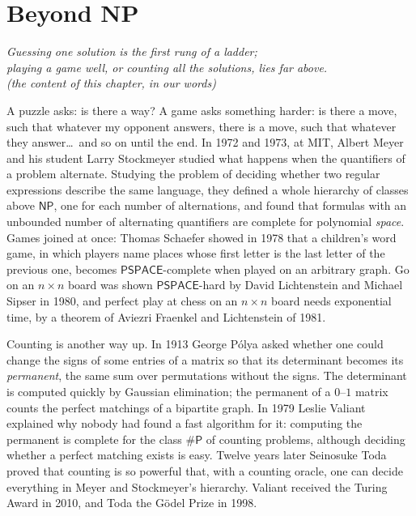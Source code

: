\chapter{Beyond NP}\label{ch:beyondnp}

\begin{center}\itshape
Guessing one solution is the first rung of a ladder;\\
playing a game well, or counting all the solutions, lies far above.\\
\upshape(the content of this chapter, in our words)
\end{center}

A puzzle asks: is there a way? A game asks something harder: is there a move, such that whatever my opponent answers, there is a move, such that whatever they answer\dots\ and so on until the end. In 1972 and 1973, at MIT, Albert Meyer and his student Larry Stockmeyer studied what happens when the quantifiers of a problem alternate. Studying the problem of deciding whether two regular expressions describe the same language, they defined a whole hierarchy of classes above $\mathsf{NP}$, one for each number of alternations, and found that formulas with an unbounded number of alternating quantifiers are complete for polynomial \emph{space}. Games joined at once: Thomas Schaefer showed in 1978 that a children's word game, in which players name places whose first letter is the last letter of the previous one, becomes $\mathsf{PSPACE}$-complete when played on an arbitrary graph. Go on an $n\times n$ board was shown $\mathsf{PSPACE}$-hard by David Lichtenstein and Michael Sipser in 1980, and perfect play at chess on an $n\times n$ board needs exponential time, by a theorem of Aviezri Fraenkel and Lichtenstein of 1981.

Counting is another way up. In 1913 George Pólya asked whether one could change the signs of some entries of a matrix so that its determinant becomes its \emph{permanent}, the same sum over permutations without the signs. The determinant is computed quickly by Gaussian elimination; the permanent of a $0$--$1$ matrix counts the perfect matchings of a bipartite graph. In 1979 Leslie Valiant explained why nobody had found a fast algorithm for it: computing the permanent is complete for the class $\#\mathsf P$ of counting problems, although deciding whether a perfect matching exists is easy. Twelve years later Seinosuke Toda proved that counting is so powerful that, with a counting oracle, one can decide everything in Meyer and Stockmeyer's hierarchy. Valiant received the Turing Award in 2010, and Toda the Gödel Prize in 1998.

